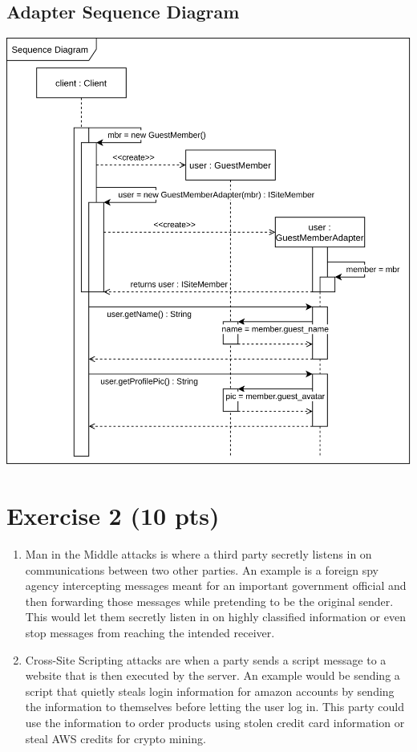 \documentclass[12pt]{article}
\begin{document}
\subsection*{Adapter Sequence Diagram}
\includegraphics[width=\linewidth]{Sequence-Diagram-Adapter.png}
\newpage
\section*{Exercise 2 (10 pts)}
\begin{enumerate}
    \item Man in the Middle attacks is where a third party secretly listens in on communications between two other parties. An example is a foreign spy agency intercepting messages meant for an important government official and then forwarding those messages while pretending to be the original sender. This would let them secretly listen in on highly classified information or even stop messages from reaching the intended receiver.
    \item Cross-Site Scripting attacks are when a party sends a script message to a website that is then executed by the server. An example would be sending a script that quietly steals login information for amazon accounts by sending the information to themselves before letting the user log in. This party could use the information to order products using stolen credit card information or steal AWS credits for crypto mining.
\end{enumerate}
\end{document}
